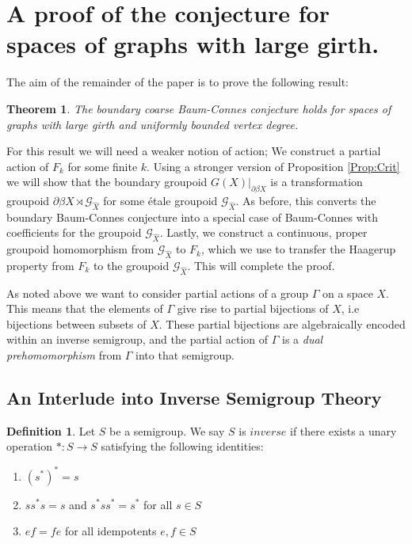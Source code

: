 \documentclass[11pt]{amsart}
\theoremstyle{plain}
\newtheorem*{thm}{Theorem}
\theoremstyle{definition}%
\newtheorem{definition}[theorem]{Definition}%
\theoremstyle{remark}%
\newcommand{\G}{\mathcal{G}}
\begin{document}
\section{A proof of the conjecture for spaces of graphs with large girth.}\label{Sect:MR}
The aim of the remainder of the paper is to prove the following result:
\begin{thm}
The boundary coarse Baum-Connes conjecture holds for spaces of graphs with large girth and uniformly bounded vertex degree.
\end{thm}

For this result we will need a weaker notion of action; We construct a partial action \cite{} of $F_{k}$ for some finite $k$. Using a stronger version of Proposition \ref{Prop:Crit} we will show that the boundary groupoid $G(X)|_{\partial\beta X}$ is a transformation groupoid $\partial\beta X \rtimes \G_{\widehat{X}}$ for some \'etale groupoid $\G_{\widehat{X}}$. As before, this converts the boundary Baum-Connes conjecture into a special case of Baum-Connes with coefficients for the groupoid $\G_{\widehat{X}}$. Lastly, we construct a continuous, proper groupoid homomorphism from $\G_{\widehat{X}}$ to $F_{k}$, which we use to transfer the Haagerup property from $F_{k}$ to the groupoid $\G_{\widehat{X}}$. This will complete the proof.

As noted above we want to consider partial actions of a group $\Gamma$ on a space $X$. This means that the elements of $\Gamma$ give rise to partial bijections of $X$, i.e bijections between subsets of $X$. These partial bijections are algebraically encoded within an inverse semigroup, and the partial action of $\Gamma$ is a \textit{dual prehomomorphism} from $\Gamma$ into that semigroup.

\subsection{An Interlude into Inverse Semigroup Theory}\label{Sect:SemiToGpoid}
                                                                               
\begin{definition}\label{Def:invsemi}
Let $S$ be a semigroup. We say $S$ is $inverse$ if there exists a unary operation $*:S \rightarrow S$ satisfying the following identities:
\begin{enumerate}
\item $(s^{*})^{*}=s$
\item $ss^{*}s=s$ and $s^{*}ss^{*}=s^{*}$ for all $s \in S$
\item $ef=fe$ for all idempotents $e,f \in S$ 
\end{enumerate}
\end{definition}
\end{document}
